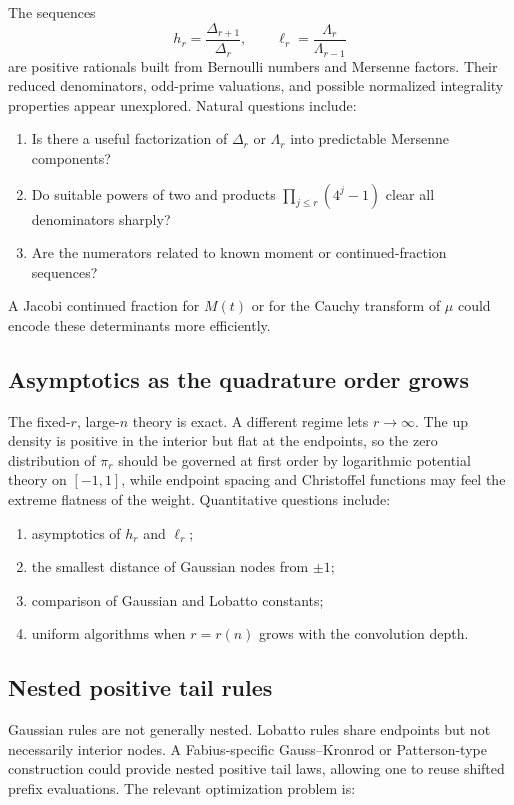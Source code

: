 \documentclass[11pt]{article}
\numberwithin{equation}{section}
\theoremstyle{definition}
\theoremstyle{remark}
\begin{document}
The sequences
\begin{equation}
 h_r=\frac{\Delta_{r+1}}{\Delta_r},
 \qquad
 \ell_r=\frac{\Lambda_r}{\Lambda_{r-1}}
 \label{p1:eq:two-constant-sequences}
\end{equation}
are positive rationals built from Bernoulli numbers and Mersenne factors.  Their reduced denominators, odd-prime valuations, and possible normalized integrality properties appear unexplored.  Natural questions include:
\begin{enumerate}
\item Is there a useful factorization of $\Delta_r$ or $\Lambda_r$ into predictable Mersenne components?
\item Do suitable powers of two and products $\prod_{j\le r}(4^j-1)$ clear all denominators sharply?
\item Are the numerators related to known moment or continued-fraction sequences?
\end{enumerate}
A Jacobi continued fraction for $M(t)$ or for the Cauchy transform of $\mu$ could encode these determinants more efficiently.

\subsection{Asymptotics as the quadrature order grows}

The fixed-$r$, large-$n$ theory is exact.  A different regime lets $r\to\infty$.  The up density is positive in the interior but flat at the endpoints, so the zero distribution of $\pi_r$ should be governed at first order by logarithmic potential theory on $[-1,1]$, while endpoint spacing and Christoffel functions may feel the extreme flatness of the weight.  Quantitative questions include:
\begin{enumerate}
\item asymptotics of $h_r$ and $\ell_r$;
\item the smallest distance of Gaussian nodes from $\pm1$;
\item comparison of Gaussian and Lobatto constants;
\item uniform algorithms when $r=r(n)$ grows with the convolution depth.
\end{enumerate}

\subsection{Nested positive tail rules}

Gaussian rules are not generally nested.  Lobatto rules share endpoints but not necessarily interior nodes.  A Fabius-specific Gauss--Kronrod or Patterson-type construction could provide nested positive tail laws, allowing one to reuse shifted prefix evaluations.  The relevant optimization problem is:
\end{document}
